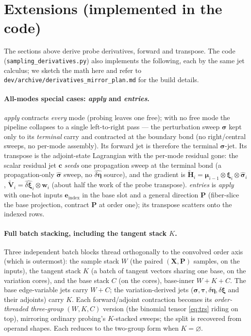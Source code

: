 \documentclass[11pt]{article}
\theoremstyle{definition}
\theoremstyle{plain}
\begin{document}
\section{Extensions (implemented in the code)}
\label{sec:extensions}

The sections above derive probe derivatives, forward and transpose. The code
(\texttt{sampling\_derivatives.py}) also implements the following, each by the same jet calculus; we sketch
the math here and refer to \texttt{dev/archive/derivatives\_mirror\_plan.md} for the build details.

\paragraph{All-modes special cases: \emph{apply} and \emph{entries}.}
\emph{apply} contracts \emph{every} mode (probing leaves one free); with no free mode the pipeline
collapses to a single left-to-right pass --- the perturbation sweep $\boldsymbol\sigma$ kept only to its
\emph{terminal} carry and contracted at the boundary bond (no right/central sweeps, no per-mode
assembly). Its forward jet is therefore the terminal $\boldsymbol\sigma$-jet. Its transpose is the
adjoint-state Lagrangian with the per-mode residual gone: the scalar residual jet $\mathbf c$ \emph{seeds}
one propagation sweep at the terminal bond (a propagation-only $\widehat{\boldsymbol\sigma}$ sweep, no
$\widehat{\delta\boldsymbol\eta}$ source), and the gradient is
$\widetilde{\mathbf H}_i = \boldsymbol\mu_{i-1}\otimes\boldsymbol\xi_i\otimes\widehat{\boldsymbol
\sigma}_i$, $\widetilde{\mathbf V}_i = \widehat{\delta\boldsymbol\xi}_i\otimes\mathbf w_i$ (about
half the work of the probe transpose). \emph{entries} is \emph{apply} with one-hot inputs $\mathbf
e_{\mathrm{index}}$ in the base slot and a general direction $\mathbf P$ (fiber-slice the base projection,
contract $\mathbf P$ at order one); its transpose scatters onto the indexed rows.

\paragraph{Full batch stacking, including the tangent stack $K$.}
Three independent batch blocks thread orthogonally to the convolved order axis (which is outermost):
the sample stack $W$ (the paired $(\mathbf X,\mathbf P)$ samples, on the inputs), the tangent stack $K$
(a batch of tangent vectors sharing one base, on the variation cores), and the base stack $C$ (on the
cores), base-inner $W{+}K{+}C$. The base edge-variable jets carry $W{+}C$; the variation-derived jets
($\boldsymbol\sigma,\boldsymbol\tau,\delta\boldsymbol\eta,\delta\boldsymbol\xi$ and their adjoints) carry
$K$. Each forward/adjoint contraction becomes its \emph{order-threaded three-group} $(W,K,C)$ version
(the binomial tensor \eqref{eq:trs} riding on top), mirroring ordinary probing's $K$-stacked sweeps;
the split is recovered from operand shapes. Each reduces to the two-group form when $K=\varnothing$.
\end{document}
